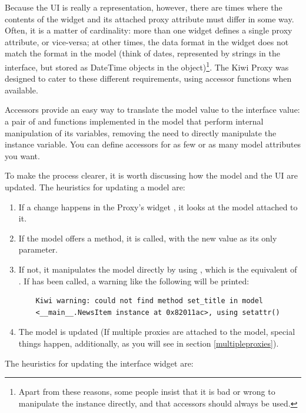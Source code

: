 \documentclass[a4paper]{howto}
\begin{document}
Because the UI is really a representation, however, there are times
where the contents of the widget and its attached proxy attribute must
differ in some way. Often, it is a matter of cardinality: more than one
widget defines a single proxy attribute, or vice-versa; at other times,
the data format in the widget does not match the format in the model
(think of dates, represented by strings in the interface, but stored as
DateTime objects in the object)\footnote{ Apart from these reasons, some
people insist that it is bad or wrong to manipulate the instance
directly, and that accessors should always be used.}. The Kiwi Proxy was
designed to cater to these different requirements, using accessor
functions when available.

Accessors provide an easy way to translate the model value to the
interface value: a pair of  and  functions
implemented in the model that perform internal manipulation of its
variables, removing the need to directly manipulate the instance
variable. You can define accessors for as few or as many model
attributes you want.

To make the process clearer, it is worth discussing how the model and
the UI are updated. The heuristics for updating a model are:

\begin{enumerate}
\item If a change happens in the Proxy's widget , it looks at
the model attached to it.
\item If the model offers a  method, it is called, with
the new value as its only parameter.
\item If not, it manipulates the model directly by using
, which is the equivalent of . If
 has been called, a warning like
the following will be printed:

    \begin{verbatim}
    Kiwi warning: could not find method set_title in model
    <__main__.NewsItem instance at 0x82011ac>, using setattr()
    \end{verbatim}

\item The model is updated (If multiple proxies are attached to the
model, special things happen, additionally, as you will see in section
\ref{multipleproxies}).
\end{enumerate}

The heuristics for updating the interface widget are:
\end{document}
